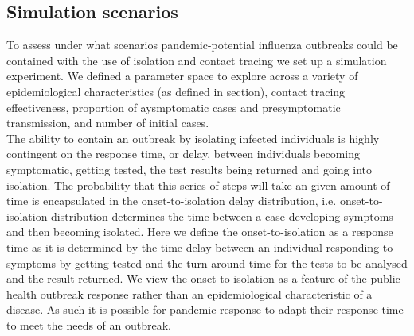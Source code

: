 \documentclass{article}
\begin{document}
\clearpage

\subsection*{Simulation scenarios}

To assess under what scenarios pandemic-potential influenza outbreaks could be contained with the use of isolation and contact tracing we set up a simulation experiment. We defined a parameter space to explore across a variety of epidemiological characteristics (as defined in  section), contact tracing effectiveness, proportion of aysmptomatic cases and presymptomatic transmission, and number of initial cases. \\

The ability to contain an outbreak by isolating infected individuals is highly contingent on the response time, or delay, between individuals becoming symptomatic, getting tested, the test results being returned and going into isolation. The probability that this series of steps will take an given amount of time is encapsulated in the onset-to-isolation delay distribution, i.e. onset-to-isolation distribution determines the time between a case developing symptoms and then becoming isolated. Here we define the onset-to-isolation as a response time as it is determined by the time delay between an individual responding to symptoms by getting tested and the turn around time for the tests to be analysed and the result returned. We view the onset-to-isolation as a feature of the public health outbreak response rather than an epidemiological characteristic of a disease. As such it is possible for pandemic response to adapt their response time to meet the needs of an outbreak. \\
\end{document}
